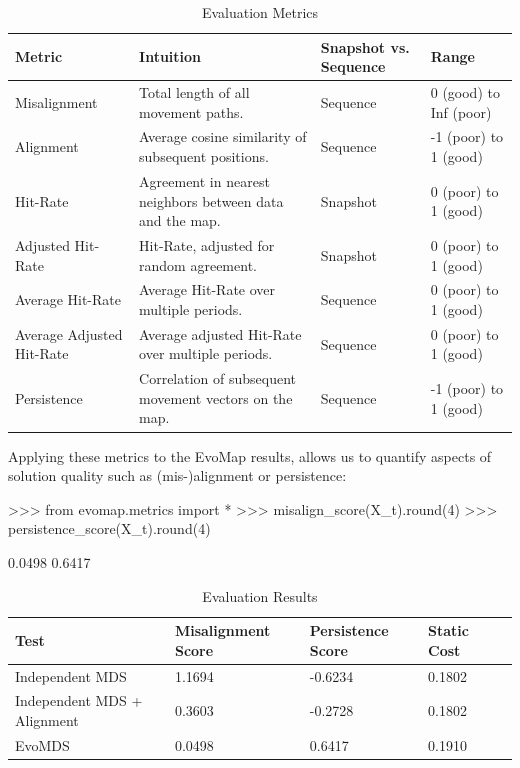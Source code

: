\documentclass[article]{jss}
\begin{document}
\begin{table}[ht]
  \centering
  \begin{tabular}{p{3cm}p{4.5cm}p{2.5cm}p{3cm}}
  \hline
  \textbf{Metric} & \textbf{Intuition} & \textbf{Snapshot \newline vs. Sequence} & \textbf{Range} \\ \hline
  Misalignment & Total length of all movement paths. & Sequence & 0 (good) to Inf (poor) \\ 
  Alignment & Average cosine similarity of subsequent positions. & Sequence & -1 (poor) to 1 (good) \\ 
  Hit-Rate & Agreement in nearest neighbors between data and the map. & Snapshot & 0 (poor) to 1 (good) \\ 
  Adjusted \newline Hit-Rate & Hit-Rate, adjusted for random agreement. & Snapshot & 0 (poor) to 1 (good) \\ 
  Average Hit-Rate & Average Hit-Rate over multiple periods. & Sequence & 0 (poor) to 1 (good) \\ 
  Average Adjusted Hit-Rate & Average adjusted Hit-Rate over multiple periods. & Sequence & 0 (poor) to 1 (good) \\ 
  Persistence & Correlation of subsequent movement vectors on the map. & Sequence & -1 (poor) to 1 (good) \\ \hline
  \end{tabular}
  \caption{\label{tab:evaluation-metrics} Evaluation Metrics}
\end{table}

Applying these metrics to the EvoMap results, allows us to quantify aspects of solution quality such as 
(mis-)alignment or persistence:

\begin{CodeChunk}
\begin{CodeInput}
>>> from evomap.metrics import *
>>> misalign_score(X_t).round(4)
>>> persistence_score(X_t).round(4)
\end{CodeInput}
\begin{CodeOutput}
0.0498
0.6417
\end{CodeOutput}
\end{CodeChunk}

\begin{table}[ht]
  \centering
  \begin{tabular}{lp{2.5cm}p{2cm}p{2cm}p{2cm}}
    \hline
    Test & Misalignment Score & Persistence Score & Static Cost \\
    \hline
    Independent MDS & 1.1694 & -0.6234 & 0.1802 \\
    Independent MDS \newline + Alignment & 0.3603 & -0.2728 & 0.1802 \\
    EvoMDS & 0.0498 & 0.6417 & 0.1910 \\
    \hline
  \end{tabular}  
  \caption{\label{tab:evaluation-results} Evaluation Results}
\end{table}
\end{document}
